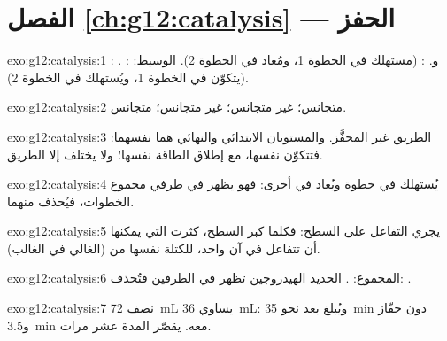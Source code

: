 \section*{الفصل \ref{ch:g12:catalysis} --- الحفز}

\begin{solution}{exo:g12:catalysis:1}
: . :  و. : 
(مستهلك في الخطوة 1، ومُعاد في الخطوة 2). الوسيط:  (يتكوّن في
الخطوة 1، ويُستهلك في الخطوة 2).
\end{solution}

\begin{solution}{exo:g12:catalysis:2}
متجانس؛ غير متجانس؛ غير متجانس؛ متجانس.
\end{solution}

\begin{solution}{exo:g12:catalysis:3}
الطريق غير المحفَّز. والمستويان الابتدائي والنهائي هما نفسهما: فتتكوّن 
نفسها، مع إطلاق الطاقة نفسها؛ ولا يختلف إلا الطريق.
\end{solution}

\begin{solution}{exo:g12:catalysis:4}
يُستهلك في خطوة ويُعاد في أخرى: فهو يظهر في
طرفي مجموع الخطوات، فيُحذف منهما.
\end{solution}

\begin{solution}{exo:g12:catalysis:5}
يجري التفاعل على السطح: فكلما كبر السطح، كثرت
 التي يمكنها أن تتفاعل في آن واحد، للكتلة نفسها من 
(الغالي في الغالب).
\end{solution}

\begin{solution}{exo:g12:catalysis:6}
المجموع: .  الحديد  الهيدروجين تظهر في الطرفين
فتُحذف: .
\end{solution}

\begin{solution}{exo:g12:catalysis:7}
نصف \qty{72}{mL} يساوي \qty{36}{mL}: ويُبلغ بعد نحو \qty{35}{min}
دون حفّاز و\qty{3.5}{min} معه.  يقصّر المدة عشر
مرات.
\end{solution}

